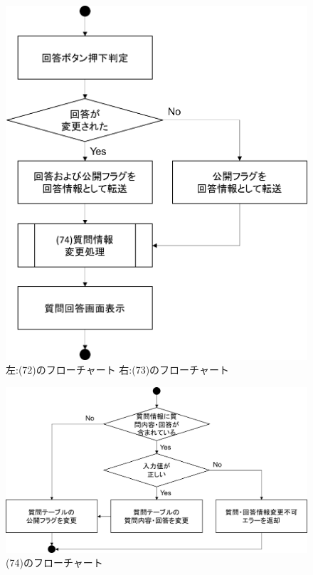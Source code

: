 \begin{figure}[htbp]
\begin{minipage}{0.5\hsize}
\begin{center}
   \includegraphics[width=0.9\linewidth,clip]{./img/flow/73.png}
  \end{center}
 \end{minipage}
 \caption{左:(72)のフローチャート 右:(73)のフローチャート}\label{fig:72to73}
\end{figure}


\begin{figure}[htbp]
  \begin{center}
    \includegraphics[width=0.8\linewidth,clip]{./img/flow/74.png}
    \caption{(74)のフローチャート}\label{fig:74}
  \end{center}
\end{figure}

\clearpage

